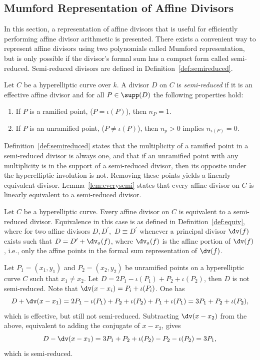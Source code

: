 \subsection{Mumford Representation of Affine Divisors}\label{sec:mumford} In
this section, a representation of affine divisors that is useful for efficiently
performing affine divisor arithmetic is presented. There exists a convenient way
to represent affine divisors using two polynomials called Mumford
representation, but is only possible if the divisor's formal sum has a compact
form called semi-reduced. Semi-reduced divisors are defined in
Definition~\ref{def:semireduced}.


\bd\label{def:semireduced}
\cite[Adapted from Definition~10.3.1]{Galbraith_PKC_2012} Let $C$ be a
hyperelliptic curve over $k$. A divisor $D$ on $C$ is \emph{semi-reduced} if it is
an effective affine divisor and for all $P \in \supp(D)$ the following properties
hold:
\begin{enumerate}
  \item If $P$ is a ramified point, ($P= \iota(P)$), then $n_P = 1$.
  \item If $P$ is an unramified point, ($P \neq \iota(P)$), then $n_p > 0$ implies
  $n_{\iota(P)} = 0$.
\end{enumerate}
\ed

Definition~\ref{def:semireduced} states that the multiplicity of a ramified
point in a semi-reduced divisor is always one, and that if an unramified point
with any multiplicity is in the support of a semi-reduced divisor, then its
opposite under the hyperelliptic involution is not. Removing these points yields
a linearly equivalent divisor. Lemma~\ref{lem:everysemi} states that every
affine divisor on $C$ is linearly equivalent to a semi-reduced divisor.

\bl\label{lem:everysemi}
\cite[Adapted from Lemma~10.3.3]{Galbraith_PKC_2012} Let $C$ be a hyperelliptic
curve. Every affine divisor on $C$ is equivalent to a semi-reduced divisor.
Equivalence in this case is as defined in Definition~\ref{def:equiv}, where for
two affine divisors $D, D^{\prime},$ $D \equiv D^{\prime}$ whenever a principal
divisor $\dv(f)$ exists such that $D = D^{\prime} + \dv_a(f)$, where $\dv_a(f)$
is the affine portion of $\dv(f)$, i.e., only the affine points in the formal
sum representation of $\dv(f)$.
\el

\be
Let $P_1 = (x_1,y_1)$ and $P_2 = (x_2, y_2)$ be unramified points on a
hyperelliptic curve $C$ such that $x_1 \neq x_2$. Let $D = 2P_1 - \iota(P_1)
+ P_2 + \iota(P_2)$, then $D$ is not semi-reduced. Note that $\dv(x - x_i)
= P_i + \iota(P_i)$. One has  $$ D + \dv(x - x_1) = 2P_1 - \iota(P_1) +
P_2 + \iota(P_2) + P_1 + \iota(P_1) = 3P_1 + P_2 + \iota(P_2),$$ which
is effective, but still not semi-reduced. Subtracting $\dv(x - x_2)$ from the
above, equivalent to adding the conjugate of $x - x_2$, gives 
$$ D - \dv(x - x_1) = 3P_1 + P_2 + \iota(P_2) - P_2 -
\iota(P_2) = 3P_1,$$ which is semi-reduced.

